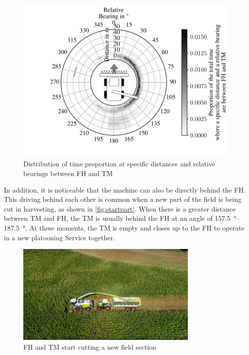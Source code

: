 \begin{figure}[H]
	\centering
	\includegraphics[width=0.99\textwidth]{figures/bearingHarvestScenario50.pdf}
	\caption{Distribution of time proportion at specific distances and relative bearings between \acf{FH} and \acf{TM}}%
	\label{fig:bearing}%
\end{figure}

In addition, it is noticeable that the machine can also be directly behind the \ac{FH}.
This driving behind each other is common when a new part of the field is being cut in harvesting,
as shown in \autoref{fig:startpart}.
When there is a greater distance between \ac{TM} and \ac{FH}, the \ac{TM} is usually behind the FH at an angle of
\SIrange{157.5}{187.5}{\degree}.
At these moments, the \ac{TM} is empty and closes up to the \ac{FH} to operate in a new platooning Service together.

\begin{figure}[H]%
	\centering
	\includegraphics[width=0.8\textwidth]{figures/claas_harvest_behind.png}
	\caption{\acf{FH} and \acf{TM} start cutting a new field section}%
	\label{fig:startpart}%
\end{figure}

